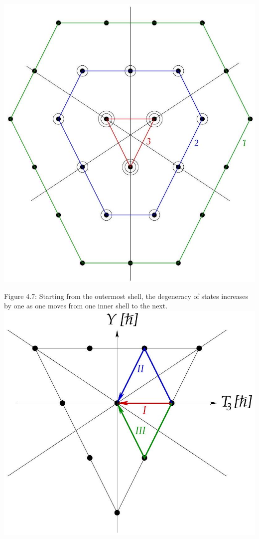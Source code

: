 \documentclass[10pt, letterpaper]{article}
\begin{document}
\begin{center}
\includegraphics[scale=0.3]{2025_05_20_8618f55a41bfe980b4b2g-52(1)}
\end{center}

Figure 4.7: Starting from the outermost shell, the degeneracy of states increases by one as one moves from one inner shell to the next.\\
\includegraphics[scale=0.3, center]{2025_05_20_8618f55a41bfe980b4b2g-52}
\end{document}

